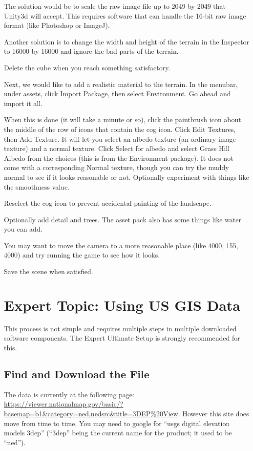 \documentclass[letter,12pt]{article}
\begin{document}
The solution would be to scale the raw image file up to 2049 by 2049 that Unity3d will accept.  This requires software that can handle the 16-bit raw image format (like Photoshop or ImageJ).  

Another solution is to change the width and height of the terrain in the Inspector to 16000 by 16000 and ignore the bad parts of the terrain.

Delete the cube when you reach something satisfactory.

Next, we would like to add a realistic material to the terrain.  In the menubar, under assets,  click Import Package, then select Environment.  Go ahead and import it all.

When this is done (it will take a minute or so), click the paintbrush icon about the middle of the row of icons that contain the cog icon.  Click Edit Textures, then Add Texture.  It will let you select an albedo texture (an ordinary image texture) and a normal texture.  Click Select for albedo and select Grass Hill Albedo from the choices (this is from the Environment package).  It does not come with a corresponding Normal texture, though you can try the muddy normal to see if it looks reasonable or not.  Optionally experiment with things like the smoothness value.

Reselect the cog icon to prevent accidental painting of the landscape.

Optionally add detail and trees.  The asset pack also has some things like water you can add.

You may want to move the camera to a more reasonable place (like 4000, 155, 4000) and try running the game to see how it looks.

Save the scene when satisfied. 

\section{Expert Topic: Using US GIS Data}

This process is not simple and requires multiple steps in multiple downloaded software components.  The Expert Ultimate Setup is strongly recommended for this.  

\subsection{Find and Download the File}

The data is currently at the following page: 
\url{https://viewer.nationalmap.gov/basic/?basemap=b1&category=ned,nedsrc&title=3DEP%20View}.%
However this site does move from time to time.  You may need to google for “usgs digital elevation models 3dep”  (“3dep” being the current name for the product; it used to be “ned”).
\end{document}
